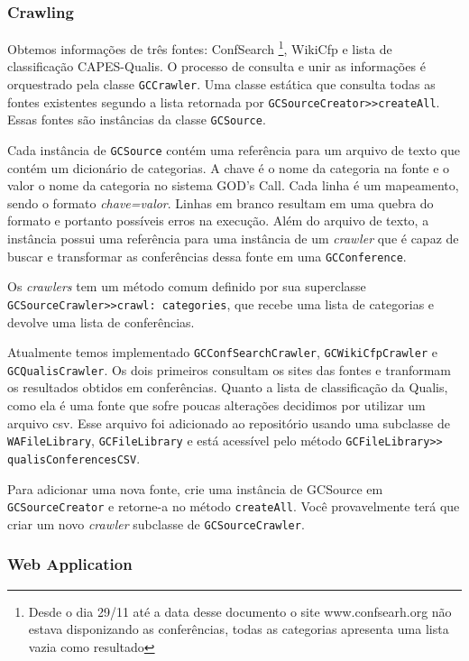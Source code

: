 \subsubsection{Crawling}%
Obtemos informações de três fontes: ConfSearch \footnote{Desde o dia 29/11 até a data desse documento o site www.confsearh.org não estava disponizando as conferências, todas as categorias
apresenta uma lista vazia como resultado}, WikiCfp e lista de classificação CAPES-Qualis. O processo de consulta e unir as informações é orquestrado pela classe \texttt{GCCrawler}. 
Uma classe estática que consulta todas as fontes existentes segundo a lista retornada por \texttt{GCSourceCreator>>createAll}. Essas fontes são instâncias da classe \texttt{GCSource}. 

Cada instância de \texttt{GCSource} contém uma referência para um arquivo de texto que contém um dicionário de categorias. A chave é o nome da categoria na fonte e o valor o nome da 
categoria no sistema GOD's Call. Cada linha é um mapeamento, sendo o formato \textit{chave=valor}. Linhas em branco resultam em uma quebra do formato e portanto possíveis 
erros na execução. Além do arquivo de texto, a instância possui uma referência para uma instância de um \textit{crawler} que é capaz de buscar e transformar as conferências dessa 
fonte em uma \texttt{GCConference}.

Os \textit{crawlers} tem um método comum definido por sua superclasse \texttt{GCSourceCrawler>>crawl: categories}, que recebe uma lista de categorias e devolve uma lista de conferências.

Atualmente temos implementado \texttt{GCConfSearchCrawler}, \texttt{GCWikiCfpCrawler} e \texttt{GCQualisCrawler}. 
Os dois primeiros consultam os sites das fontes e tranformam os resultados obtidos em conferências. 
Quanto a lista de classificação da Qualis, como ela é uma fonte que sofre poucas alterações decidimos por utilizar um arquivo csv. Esse arquivo foi adicionado ao repositório usando uma subclasse de \texttt{WAFileLibrary}, \texttt{GCFileLibrary} e está acessível pelo método \texttt{GCFileLibrary>> qualisConferencesCSV}. 

Para adicionar uma nova fonte, crie uma instância de GCSource em \texttt{GCSourceCreator} e retorne-a no método \texttt{createAll}. Você provavelmente terá que criar um novo \textit{crawler} subclasse de \texttt{GCSourceCrawler}.

\subsubsection{Web Application} %

